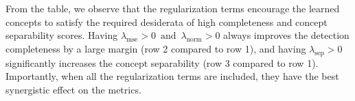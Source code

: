 From the table, we observe that the regularization terms encourage the learned concepts to satisfy the required desiderata of high completeness and concept separability scores.
Having $\lambda_\textrm{mse} > 0\, \text{ and } \,\lambda_\textrm{norm} > 0$ always improves the detection completeness by a large margin (\ie row 2 compared to row 1), and having $\lambda_\textrm{sep} > 0$ significantly increases the concept separability (\ie row 3 compared to row 1).
Importantly, when all the regularization terms are included, they have the best synergistic effect on the metrics. 

